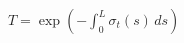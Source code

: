 \documentclass[border=6pt]{standalone}
\begin{document}
\color{black}
\(\displaystyle
T = \exp\!\left(-\int_0^L \sigma_t(s)\,ds\right)
\)
\end{document}

